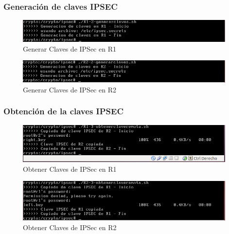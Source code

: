 \documentclass[a4paper,10pt]{article}
\begin{document}
			\subsubsection{Generación de claves IPSEC}
	\begin{figure}[H]
		\centering
		\includegraphics[width=11cm]{Imagenes/generarClaveR1.png}
		\caption{Generar Claves de IPSec en R1}
	\end{figure}	
	\begin{figure}[H]
		\centering
		\includegraphics[width=11cm]{Imagenes/generarClaveR2.png}
		\caption{Generar Claves de IPSec en R2}
	\end{figure}			
			
			\subsubsection{Obtención de la claves IPSEC}
	\begin{figure}[H]
		\centering
		\includegraphics[width=11cm]{Imagenes/obtencionClaveIPsecR1.png}
		\caption{Obtener Claves de IPSec en R1}
	\end{figure}	
	\begin{figure}[H]
		\centering
		\includegraphics[width=11cm]{Imagenes/obtencionClaveIPsecR2.png}
		\caption{Obtener Claves de IPSec en R2}
	\end{figure}		
	
\end{document}
